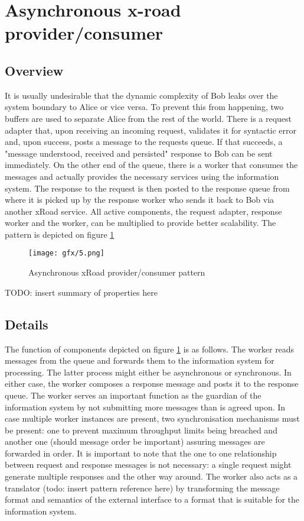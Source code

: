 \documentclass[10pt,a4paper]{article}
\begin{document}
\section{Asynchronous x-road provider/consumer}
\label{sec:p:5}
\subsection{Overview}
It is usually undesirable that the dynamic complexity  of Bob leaks over the system boundary to Alice or vice versa. To prevent this from happening, two buffers are used to separate Alice from the rest of the world. There is a request adapter that, upon receiving an incoming request, validates it for syntactic error and, upon success, posts a message to the requests queue. If that succeeds, a "message understood, received and persisted" response to Bob can be sent immediately. On the other end of the queue, there is a worker that consumes the messages and actually provides the necessary services using the information system. The response to the request is then posted to the response queue from where it is picked up by the response worker who sends it back to Bob via another xRoad service. All active components, the request adapter, response worker and the worker, can be multiplied to provide better scalability. The pattern is depicted on figure \ref{fig:p:5}

\begin{figure}[htp]
	\begin{center}
		\texttt{[image: gfx/5.png]}
		\caption{Asynchronous xRoad provider/consumer pattern}
		\label{fig:p:5}
	\end{center}
\end{figure}
 TODO: insert summary of properties here

\subsection{Details}
The function of components depicted on figure \ref{fig:p:5} is as follows.
The worker reads messages from the queue and forwards them to the information system for processing. The latter process might either be asynchronous or synchronous. In either case, the worker composes a response message and posts it to the response queue. The worker serves an important function as the guardian of the information system by not submitting more messages than is agreed upon. In case multiple worker instances are present, two synchronisation mechanisms must be present: one to prevent maximum throughput limits being breached and another one (should message order be important) assuring messages are forwarded in order. It is important to note that the one to one relationship between request and response messages is not necessary: a single request might generate multiple responses and the other way around. The worker also acts as a translator (todo: insert pattern reference here) by transforming the message format and semantics of the external interface to a format that is suitable for the information system. 
\end{document}
